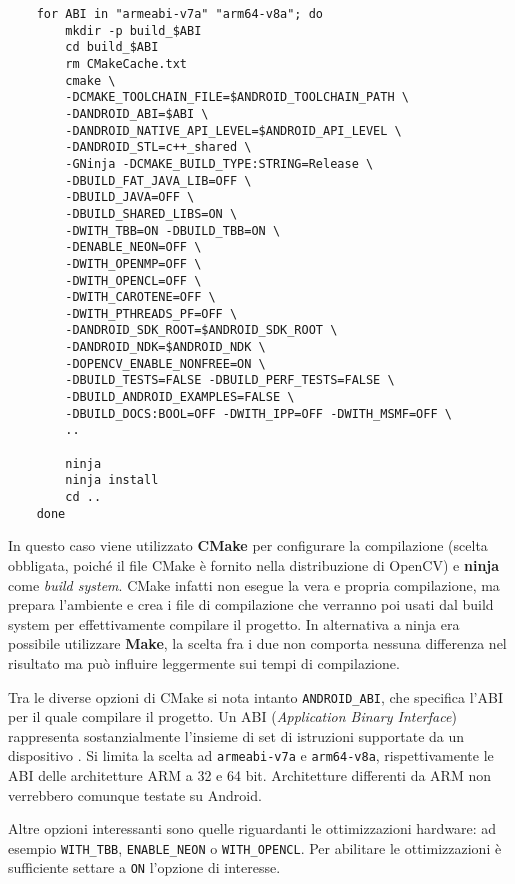 \begin{verbatim}
    for ABI in "armeabi-v7a" "arm64-v8a"; do
        mkdir -p build_$ABI
        cd build_$ABI
        rm CMakeCache.txt
        cmake \
        -DCMAKE_TOOLCHAIN_FILE=$ANDROID_TOOLCHAIN_PATH \
        -DANDROID_ABI=$ABI \
        -DANDROID_NATIVE_API_LEVEL=$ANDROID_API_LEVEL \
        -DANDROID_STL=c++_shared \
        -GNinja -DCMAKE_BUILD_TYPE:STRING=Release \
        -DBUILD_FAT_JAVA_LIB=OFF \
        -DBUILD_JAVA=OFF \
        -DBUILD_SHARED_LIBS=ON \
        -DWITH_TBB=ON -DBUILD_TBB=ON \
        -DENABLE_NEON=OFF \
        -DWITH_OPENMP=OFF \
        -DWITH_OPENCL=OFF \
        -DWITH_CAROTENE=OFF \
        -DWITH_PTHREADS_PF=OFF \
        -DANDROID_SDK_ROOT=$ANDROID_SDK_ROOT \
        -DANDROID_NDK=$ANDROID_NDK \
        -DOPENCV_ENABLE_NONFREE=ON \
        -DBUILD_TESTS=FALSE -DBUILD_PERF_TESTS=FALSE \
        -DBUILD_ANDROID_EXAMPLES=FALSE \
        -DBUILD_DOCS:BOOL=OFF -DWITH_IPP=OFF -DWITH_MSMF=OFF \
        ..
    
        ninja
        ninja install
        cd ..
    done
\end{verbatim}

In questo caso viene utilizzato \textbf{CMake} per configurare la compilazione (scelta obbligata, poiché il file CMake è fornito 
nella distribuzione di OpenCV) e \textbf{ninja} come \textit{build system}. 
CMake infatti non esegue la vera e propria compilazione, ma prepara l'ambiente e crea i file di compilazione che 
verranno poi usati dal build system per effettivamente compilare il progetto. In alternativa a ninja era possibile 
utilizzare \textbf{Make}, la scelta fra i due non comporta nessuna differenza nel risultato ma può influire leggermente 
sui tempi di compilazione.

Tra le diverse opzioni di CMake si nota intanto \texttt{ANDROID\_ABI}, che specifica l'ABI per il quale compilare il
progetto. Un ABI (\textit{Application Binary Interface}) rappresenta sostanzialmente l'insieme di set di istruzioni
supportate da un dispositivo \cite{adev_abi}. Si limita la scelta ad \texttt{armeabi-v7a} e \texttt{arm64-v8a}, rispettivamente 
le ABI delle architetture ARM a 32 e 64 bit. Architetture differenti da ARM non verrebbero comunque testate su Android.

Altre opzioni interessanti sono quelle riguardanti le ottimizzazioni hardware: ad esempio \texttt{WITH\_TBB}, 
\texttt{ENABLE\_NEON} o \texttt{WITH\_OPENCL}. Per abilitare le ottimizzazioni è sufficiente settare a \texttt{ON}
l'opzione di interesse.

